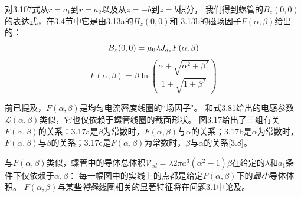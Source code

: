 对3.107式从$r=a_1$到$r=a_2$以及从$z=-b$到$z=b$积分，
我们得到螺管的$B_z(0,0)$的表达式，在3.4节中它是由3.13a的$H_z(0,0)$和
3.13b的磁场因子$F(\alpha,\beta)$给出的：
\begin{equation}
B_z(0,0)=\mu_0\lambda J_{a_1}F(\alpha,\beta)\\ %
\end{equation}
\begin{equation*}
F(\alpha,\beta)=\beta \ln\left(\frac{\alpha+\sqrt{\alpha^2+\beta^2}}{1+\sqrt{1+\beta^2}}\right) \tag{3.13b}
\end{equation*}

前已提及，$F(\alpha,\beta)$是均匀电流密度线圈的``场因子"。
和式3.81给出的电感参数$\mathcal{L}(\alpha,\beta)$类似，它也仅依赖于螺管线圈的截面形状。
图3.17给出了三组有关$F(\alpha,\beta)$的关系：3.17a是$\beta$为常数时，$F(\alpha,\beta)$与$\alpha$的关系；3.17b是$\alpha$为常数时，$F(\alpha,\beta)$与$\beta$的关系；3.17c是$F(\alpha,\beta)$为常数时，$\beta$与$\alpha$的关系[3.8]。

与$F(\alpha,\beta)$类似，螺管中的导体总体积$\mathcal{V}_{cd}=\lambda 2\pi a_1^3(\alpha^2-1)\beta$在给定的$\lambda$和$a_1$条件下仅依赖于$\alpha,\beta$：
每一幅图中的实线上的点都是给定$F(\alpha,\beta)$下的\textit{最小}导体体积。
$F(\alpha,\beta)$与某些\textit{特殊}线圈相关的显著特征将在问题3.1中论及。

